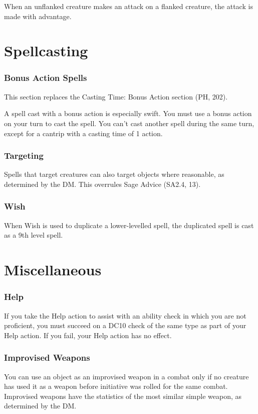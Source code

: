 \documentclass[letterpaper,twocolumn,openany,nodeprecatedcode]{dndbook}
\begin{document}
When an unflanked creature makes an attack on a flanked creature, the attack is made with advantage.




\section{Spellcasting}

\subsubsection{Bonus Action Spells}
This section replaces the Casting Time: Bonus Action section (PH, 202).

A spell cast with a bonus action is especially swift. You must use a bonus action on your turn to cast the spell. You can't cast another spell during the same turn, except for a cantrip with a casting time of 1 action.

\subsubsection{Targeting}
Spells that target creatures can also target objects where reasonable, as determined by the DM. This overrules Sage Advice (SA2.4, 13).

\subsubsection{Wish}
When Wish is used to duplicate a lower-levelled spell, the duplicated spell is cast as a 9th level spell.




\section{Miscellaneous}

\subsubsection{Help}
If you take the Help action to assist with an ability check in which you are not proficient, you must succeed on a DC10 check of the same type as part of your Help action. If you fail, your Help action has no effect.

\subsubsection{Improvised Weapons}
You can use an object as an improvised weapon in a combat only if no creature has used it as a weapon before initiative was rolled for the same combat. Improvised weapons have the statistics of the most similar simple weapon, as determined by the DM.
\end{document}
